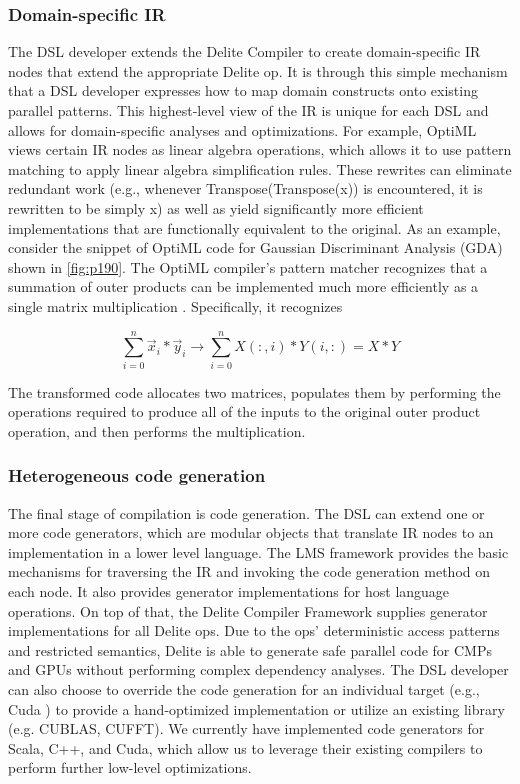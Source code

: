 \subsubsection{Domain-specific IR}

The DSL developer extends the Delite Compiler to create
domain-specific IR nodes that extend the appropriate Delite
op. It is through this simple mechanism that a DSL developer expresses how to map domain constructs onto existing parallel patterns. This highest-level view of the IR is
unique for each DSL and allows for domain-specific analyses
and optimizations. For example, OptiML views certain IR
nodes as linear algebra operations, which allows it to use
pattern matching to apply linear algebra simplification rules.
These rewrites can eliminate redundant work (e.g., whenever
Transpose(Transpose(x)) is encountered, it is rewritten to be
simply x) as well as yield significantly more efficient implementations that are functionally equivalent to the original. As
an example, consider the snippet of OptiML code for Gaussian
Discriminant Analysis (GDA) shown in \ref{fig:p190}. The OptiML compiler’s pattern matcher recognizes that a summation of
outer products can be implemented much more efficiently as
a single matrix multiplication \cite{sujeeth2011optiml}. Specifically, it recognizes


$$
\sum_{i=0}^n \vec{x}_i * \vec{y}_i \rightarrow \sum_{i=0}^n X(:, i) * Y(i,:)=X * Y
$$

The transformed code allocates two matrices, populates
them by performing the operations required to produce all
of the inputs to the original outer product operation, and then
performs the multiplication.



\subsubsection{Heterogeneous code generation}
The final stage of compilation is code generation. The
DSL can extend one or more code generators, which are
modular objects that translate IR nodes to an implementation
in a lower level language. The LMS framework provides the
basic mechanisms for traversing the IR and invoking the code
generation method on each node. It also provides generator
implementations for host language operations. On top of that,
the Delite Compiler Framework supplies generator implementations for all Delite ops. Due to the ops’ deterministic access
patterns and restricted semantics, Delite is able to generate
safe parallel code for CMPs and GPUs without performing
complex dependency analyses. The DSL developer can also
choose to override the code generation for an individual target
(e.g., Cuda \cite{CUDAZone76:online}) to provide a hand-optimized implementation
or utilize an existing library (e.g. CUBLAS, CUFFT). We
currently have implemented code generators for Scala, C++,
and Cuda, which allow us to leverage their existing compilers
to perform further low-level optimizations.

